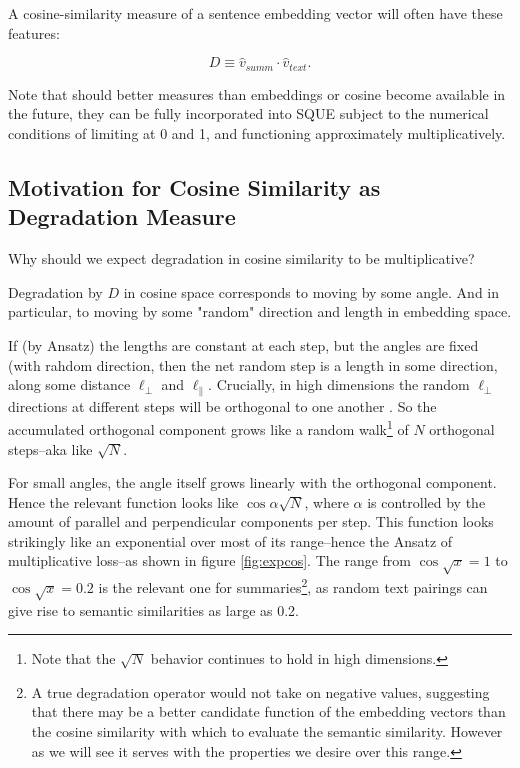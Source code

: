 \documentclass{article}
\begin{document}
A cosine-similarity measure of a sentence embedding vector will often have these features: 

\begin{equation}
	D \equiv \hat{v}_{summ} \cdot \hat{v}_{text}.
\end{equation}


Note that should better measures than embeddings or cosine become available in the future, they can be fully incorporated into SQUE subject to the numerical conditions of limiting at 0 and 1, and functioning approximately multiplicatively.

\subsection{Motivation for Cosine Similarity as Degradation Measure}

Why should we expect degradation in cosine similarity to be multiplicative?

Degradation by $D$ in cosine space corresponds to moving by some angle. 
And in particular, to moving by some "random" direction and length in embedding space.

If (by Ansatz) the lengths are constant at each step, but the angles are fixed (with rahdom direction, then the net random step is a length in some direction, along some distance $\ell_{\perp}$ and $\ell_{\parallel}$.
Crucially, in high dimensions the random $\ell_{\perp}$ directions at different steps will be orthogonal to one another \citet{randomwalk}. 
So the accumulated orthogonal component grows like a random walk\footnote{Note that the $\sqrt{N}$ behavior continues to hold in high dimensions.} of $N$ orthogonal steps--aka like $\sqrt{N}$.  

For small angles, the angle itself grows linearly with the orthogonal component.
Hence the relevant function looks like $\cos{\alpha \sqrt{N}}$, where $\alpha$ is controlled by the amount of parallel and perpendicular components per step.
This function looks strikingly like an exponential over most of its range--hence the Ansatz of multiplicative loss--as shown in figure \ref{fig:expcos}.
The range from $\cos \sqrt{x}=1$ to $\cos \sqrt{x} = 0.2$ is the relevant one for summaries\footnote{A true degradation operator would not take on negative values, suggesting that there may be a better candidate function of the embedding vectors than the cosine similarity with which to evaluate the semantic similarity.  However as we will see it serves with the properties we desire over this range.}, as random text pairings can give rise to semantic similarities as large as 0.2.
\end{document}
